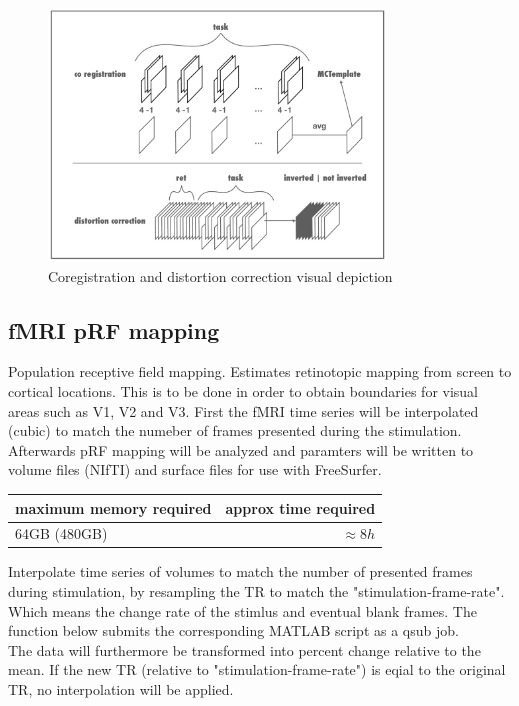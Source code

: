 \documentclass[12pt,a4paper]{scrartcl}
\begin{document}
\begin{figure}
\begin{center}
\includegraphics[width=0.8\textwidth]{coregdist}
\caption[Coregistration and distortion correction visual depiction]{Coregistration and distortion correction visual depiction}
\label{fig:coregdist}
\end{center}
\end{figure}

\subsection{fMRI pRF mapping}
Population receptive field mapping. Estimates retinotopic mapping from screen to cortical locations. This is to be done in order to obtain boundaries for visual areas such as V1, V2 and V3. First the fMRI time series will be interpolated (cubic) to match the numeber of frames presented during the stimulation. Afterwards pRF mapping will be analyzed and paramters will be written to volume files (NIfTI) and surface files for use with FreeSurfer.
\begin{table}[h]
\begin{tabular}{l | r}
\toprule
maximum memory required & approx time required\\\toprule
64GB (480GB) & $\approx 8h$ \\\bottomrule
\end{tabular}
\end{table}
\FloatBarrier
\noindent Interpolate time series of volumes to match the number of presented frames during stimulation, by resampling the TR to match the "stimulation-frame-rate". Which means the change rate of the stimlus and eventual blank frames. The function below submits the corresponding MATLAB script as a qsub job.\\
The data will furthermore be transformed into percent change relative to the mean. If the new TR (relative to "stimulation-frame-rate") is eqial to the original TR, no interpolation will be applied.\\
\end{document}

